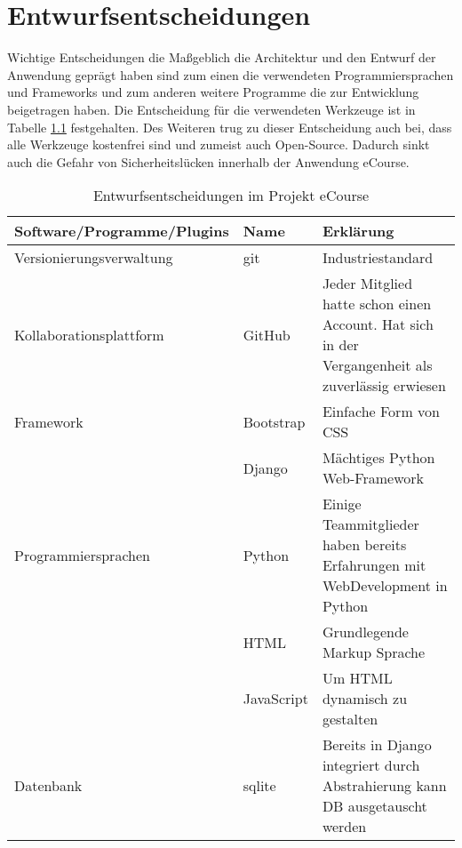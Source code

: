 \chapter{Entwurfsentscheidungen}
\label{sec:Entwurf}
Wichtige Entscheidungen die Maßgeblich die Architektur und den Entwurf der Anwendung geprägt haben sind zum einen die verwendeten Programmiersprachen und \gls{Framework}s und zum anderen weitere Programme die zur Entwicklung beigetragen haben.
Die Entscheidung für die verwendeten Werkzeuge ist in Tabelle \ref{tab:Entwurfsentscheidungen} festgehalten. Des Weiteren trug zu dieser Entscheidung auch bei, dass alle Werkzeuge kostenfrei sind und zumeist auch Open-Source. Dadurch sinkt auch die Gefahr von Sicherheitslücken innerhalb der Anwendung eCourse.

\begin{table}[H]
\centering
\begin{tabularx}{\textwidth}{|l|l|X|} 
 \hline 
Software/Programme/Plugins & Name & Erklärung \\ 
\hline
Versionierungsverwaltung & git & Industriestandard \\ 
\hline
Kollaborationsplattform & GitHub & Jeder Mitglied hatte schon einen Account. Hat sich in der Vergangenheit als zuverlässig erwiesen \\ 
\hline
Framework & Bootstrap & Einfache Form von CSS \\ 
\hline
 & Django & Mächtiges Python Web-Framework \\ 
\hline
Programmiersprachen & Python & Einige Teammitglieder haben bereits Erfahrungen mit WebDevelopment in Python \\ 
\hline
 & HTML & Grundlegende Markup Sprache  \\ 
\hline
 & JavaScript & Um HTML dynamisch zu gestalten \\ 
\hline
Datenbank & sqlite & Bereits in Django integriert durch Abstrahierung kann DB ausgetauscht werden \\ 
\hline
\end{tabularx}
\caption{Entwurfsentscheidungen im Projekt eCourse}
\label{tab:Entwurfsentscheidungen}
\end{table}

